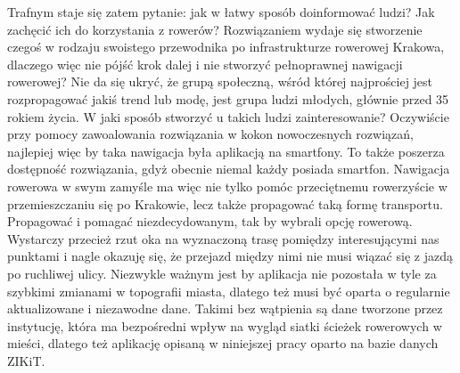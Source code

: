 Trafnym staje się zatem pytanie: jak w łatwy sposób doinformować ludzi? Jak zachęcić ich do korzystania z rowerów? Rozwiązaniem wydaje się stworzenie czegoś w rodzaju swoistego przewodnika po infrastrukturze rowerowej Krakowa, dlaczego więc nie pójść krok dalej i nie stworzyć pełnoprawnej nawigacji rowerowej? Nie da się ukryć, że grupą społeczną, wśród której najprościej jest rozpropagować jakiś trend lub modę, jest grupa ludzi młodych, głównie przed 35 rokiem życia. W jaki sposób stworzyć u takich ludzi zainteresowanie? Oczywiście przy pomocy zawoalowania rozwiązania w kokon nowoczesnych rozwiązań, najlepiej więc by taka nawigacja była aplikacją na smartfony. To także poszerza dostępność rozwiązania, gdyż obecnie niemal każdy posiada smartfon. \newline
Nawigacja rowerowa w swym zamyśle ma więc nie tylko pomóc przeciętnemu rowerzyście w przemieszczaniu się po Krakowie, lecz także propagować taką formę transportu. Propagować i pomagać niezdecydowanym, tak by wybrali opcję rowerową. Wystarczy przecież rzut oka na wyznaczoną trasę pomiędzy interesującymi nas punktami i nagle okazuję się, że przejazd między nimi nie musi wiązać się z jazdą po ruchliwej ulicy. Niezwykle ważnym jest by aplikacja nie pozostała w tyle za szybkimi zmianami w topografii miasta, dlatego też musi być oparta o regularnie aktualizowane i niezawodne dane. Takimi bez wątpienia są dane tworzone przez instytucję, która ma bezpośredni wpływ na wygląd siatki ścieżek rowerowych w mieści, dlatego też aplikację opisaną w niniejszej pracy oparto na bazie danych ZIKiT.
